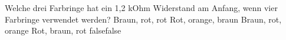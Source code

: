     {Welche drei Farbringe hat ein 1,2 kOhm Widerstand am Anfang, wenn vier Farbringe verwendet werden?}
    {Braun, rot, rot}
    {Rot, orange, braun}
    {Braun, rot, orange}
    {Rot, braun, rot}
    {false}{false}